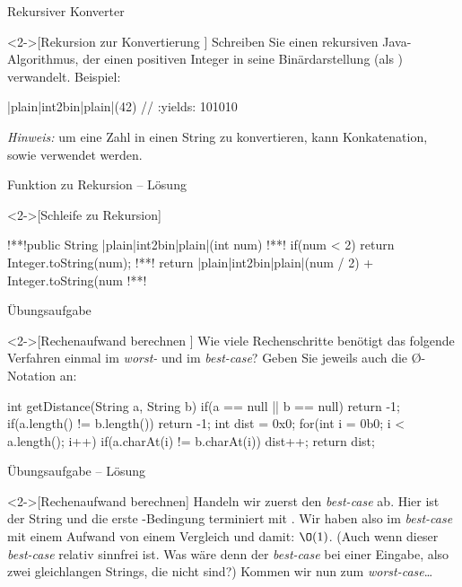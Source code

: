 \begin{frame}[fragile,c]{Rekursiver Konverter}
    \begin{exercise}<2->[Rekursion zur Konvertierung ]
        \pause{}Schreiben Sie einen rekursiven Java-Algorithmus, der einen positiven Integer in seine Binärdarstellung (als ) verwandelt. Beispiel:\pause{}
\begin{plainjava}
|plain|int2bin|plain|(42) // :yields: 101010
\end{plainjava}
    \pause{}\textit{Hinweis:} um eine Zahl in einen String zu konvertieren, kann Konkatenation,\pause{} sowie  verwendet werden.
    \end{exercise}
\end{frame}

\begin{frame}[fragile,c]{Funktion zu Rekursion -- Lösung}
    \begin{solve}<2->[Schleife zu Rekursion]
\begin{plainjava}
!**!public String |plain|int2bin|plain|(int num){
!**!    if(num < 2) return Integer.toString(num);
!**!    return |plain|int2bin|plain|(num / 2) + Integer.toString(num %
!**!}
\end{plainjava}
    \end{solve}
\end{frame}

\begin{frame}[fragile,c]{Übungsaufgabe}
    \begin{exercise}<2->[Rechenaufwand berechnen ]
        \pause{}Wie viele Rechenschritte benötigt das folgende Verfahren einmal im \emph{worst-} und im \emph{best-case}? Geben Sie jeweils auch die \O-Notation an: \pause{}
\begin{plainjava}
int getDistance(String a, String b){
    if(a == null || b == null) return -1;
    if(a.length() != b.length()) return -1;
    int dist = 0x0;
    for(int i = 0b0; i < a.length(); i++)
        if(a.charAt(i) != b.charAt(i))
            dist++;
    return dist;
}
\end{plainjava}
    \end{exercise}
\end{frame}

\begin{frame}[c]{Übungsaufgabe -- Lösung}
    \begin{solve}<2->[Rechenaufwand berechnen]
    \pause{}Handeln wir zuerst den \emph{best-case} ab.\pause{} Hier ist der String   und die erste -Bedingung terminiert mit .\pause{} Wir haben also im \emph{best-case} mit einem Aufwand von einem Vergleich und damit: \(\O(1)\).\pause{} (Auch wenn dieser \emph{best-case} relativ sinnfrei ist.\pause{} Was wäre denn der \emph{best-case} bei einer  Eingabe\pause{}, also zwei gleichlangen Strings, die nicht  sind?)\pause{} Kommen wir nun zum \emph{worst-case}\ldots
    \end{solve}
\end{frame}

